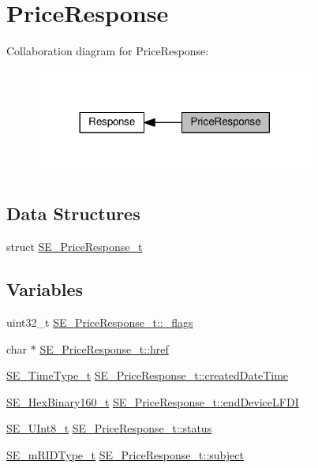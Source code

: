 \hypertarget{group__PriceResponse}{}\section{Price\+Response}
\label{group__PriceResponse}
Collaboration diagram for Price\+Response\+:\nopagebreak
\begin{figure}[H]
\begin{center}
\leavevmode
\includegraphics[width=260pt]{group__PriceResponse}
\end{center}
\end{figure}
\subsection*{Data Structures}
\begin{DoxyCompactItemize}
\item 
struct \hyperlink{structSE__PriceResponse__t}{S\+E\+\_\+\+Price\+Response\+\_\+t}
\end{DoxyCompactItemize}
\subsection*{Variables}
\begin{DoxyCompactItemize}
\item 
uint32\+\_\+t \hyperlink{group__PriceResponse_ga03c805f3561a787a08ee7d85f906c991}{S\+E\+\_\+\+Price\+Response\+\_\+t\+::\+\_\+flags}
\item 
char $\ast$ \hyperlink{group__PriceResponse_ga74e2af000045c4743754d6a2c585fbed}{S\+E\+\_\+\+Price\+Response\+\_\+t\+::href}
\item 
\hyperlink{group__TimeType_ga6fba87a5b57829b4ff3f0e7638156682}{S\+E\+\_\+\+Time\+Type\+\_\+t} \hyperlink{group__PriceResponse_gaca058e6a4b9bdabf0802cbab15dc0df2}{S\+E\+\_\+\+Price\+Response\+\_\+t\+::created\+Date\+Time}
\item 
\hyperlink{group__HexBinary160_ga92b92aa55555bdb75f3a59060f2c1632}{S\+E\+\_\+\+Hex\+Binary160\+\_\+t} \hyperlink{group__PriceResponse_ga690190c08ea8f2142672cca33e552a08}{S\+E\+\_\+\+Price\+Response\+\_\+t\+::end\+Device\+L\+F\+DI}
\item 
\hyperlink{group__UInt8_gaf7c365a1acfe204e3a67c16ed44572f5}{S\+E\+\_\+\+U\+Int8\+\_\+t} \hyperlink{group__PriceResponse_ga1660cfe81626577fdff445d0503634ff}{S\+E\+\_\+\+Price\+Response\+\_\+t\+::status}
\item 
\hyperlink{group__mRIDType_gac74622112f3a388a2851b2289963ba5e}{S\+E\+\_\+m\+R\+I\+D\+Type\+\_\+t} \hyperlink{group__PriceResponse_ga63c19ee87750d603c251c988496b702e}{S\+E\+\_\+\+Price\+Response\+\_\+t\+::subject}
\end{DoxyCompactItemize}


